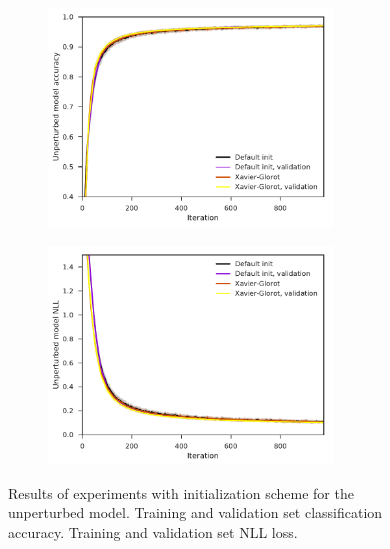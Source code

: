 \begin{figure}[tbp!]
    \begin{subfigure}[b]{0.49\textwidth}
        \centering
        \includegraphics[height=5.8cm]{graphics/E020-init-analysis/accuracy_unp-all-series-mean-sd.pdf}
        \caption{}
        \label{fig: Theory: E020-init-analysis/accuracy_unp-all-series-mean-sd}
    \end{subfigure}
    \hfill
    \begin{subfigure}[b]{0.49\textwidth}
        \centering
        \includegraphics[height=5.8cm]{graphics/E020-init-analysis/return_unp-all-series-mean-sd.pdf}
        \caption{}
        \label{fig: Theory: E020-init-analysis/return_unp-all-series-mean-sd}
    \end{subfigure}
    \caption{
        Results of experiments with initialization scheme for the unperturbed model.
         Training and validation set classification accuracy.
         Training and validation set \gls{NLL} loss.
    }
    \label{fig: Theory: E020-init-analysis}
\end{figure}
\fi






